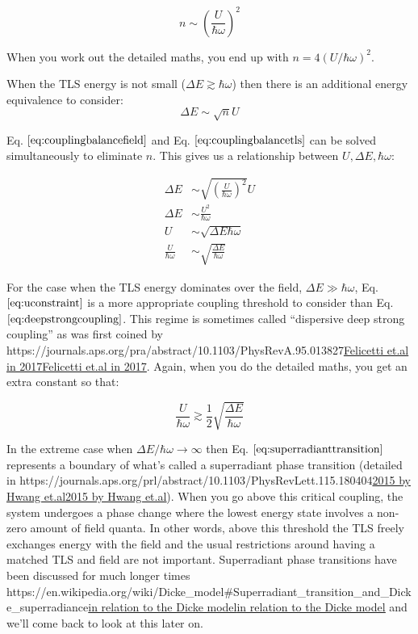 \documentclass[
]{article}
\let\oldhref\href
\renewcommand{\href}[2]{\ifx#1\urlprefix\oldhref{#1}{#2}\else\uline{\oldhref{#1}{#2}}\fi}
\renewcommand{\[}{\begin{equation}}
\renewcommand{\]}{\end{equation}}
\begin{document}
\[
n \sim \left(\frac{U}{\hbar\omega}\right)^2
\label{eq:selfconsistentn}
\]

When you work out the detailed maths, you end up with
\(n = 4(U/\hbar\omega)^2\).

When the TLS energy is not small (\(\Delta E \gtrsim \hbar \omega\))
then there is an additional energy equivalence to consider: \[
\Delta E \sim \sqrt{n}U
\label{eq:couplingbalancetls}
\]

Eq. \(\ref{eq:couplingbalancefield}\) and Eq.
\(\ref{eq:couplingbalancetls}\) can be solved simultaneously to
eliminate \(n\). This gives us a relationship between
\(U,\Delta E,\hbar\omega\):

\[
\begin{aligned}
\Delta E &\sim \sqrt{\left(\frac{U}{\hbar\omega}\right)^2}U \\
\Delta E &\sim \frac{U^2}{\hbar\omega} \\
U &\sim \sqrt{\Delta E \hbar\omega} \\
\frac{U}{\hbar\omega} &\sim \sqrt{\frac{\Delta E}{\hbar\omega}}
\end{aligned}
\label{eq:uconstraint}
\]

For the case when the TLS energy dominates over the field,
\(\Delta E \gg \hbar \omega\), Eq. \(\ref{eq:uconstraint}\) is a more
appropriate coupling threshold to consider than Eq.
\(\ref{eq:deepstrongcoupling}\). This regime is sometimes called
``dispersive deep strong coupling'' as was first coined by
\href{https://journals.aps.org/pra/abstract/10.1103/PhysRevA.95.013827}{Felicetti
et.al in 2017}. Again, when you do the detailed maths, you get an extra
constant so that:

\[
\frac{U}{\hbar\omega} \gtrsim \frac{1}{2}\sqrt{\frac{\Delta E}{\hbar\omega}}
\label{eq:superradianttransition}
\]

In the extreme case when \(\Delta E/\hbar\omega \rightarrow \infty\)
then Eq. \(\ref{eq:superradianttransition}\) represents a boundary of
what's called a superradiant phase transition (detailed in
\href{https://journals.aps.org/prl/abstract/10.1103/PhysRevLett.115.180404}{2015
by Hwang et.al}). When you go above this critical coupling, the system
undergoes a phase change where the lowest energy state involves a
non-zero amount of field quanta. In other words, above this threshold
the TLS freely exchanges energy with the field and the usual
restrictions around having a matched TLS and field are not important.
Superradiant phase transitions have been discussed for much longer times
\href{https://en.wikipedia.org/wiki/Dicke_model\#Superradiant_transition_and_Dicke_superradiance}{in
relation to the Dicke model} and we'll come back to look at this later
on.
\end{document}
